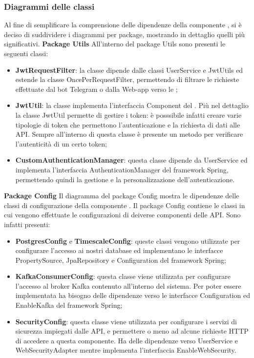 	\subsubsection{Diagrammi delle classi}
		Al fine di semplificare la comprensione delle dipendenze della componente , si è deciso di suddividere i diagrammi per package, mostrando in dettaglio quelli più significativi.
		\newline\newline
		\textbf{Package Utils}
		\newline
		All'interno del package Utils sono presenti le seguenti classi:
		\begin{itemize}
			\item \textbf{JwtRequestFilter}: la classe dipende dalle classi UserService e JwtUtils ed estende la classe OncePerRequestFilter, permettendo di filtrare le richieste effettuate dal bot Telegram o dalla Web-app verso le \glock{API};
			\item \textbf{JwtUtil}: la classe implementa l'interfaccia Component del . Più nel dettaglio la classe JwtUtil permette di gestire i token: è posssibile infatti creare varie tipologie di token che permettono l'autenticazione e la richiesta di dati alle API. Sempre all'interno di questa classe è presente un metodo per verificare l'autenticità di un certo token;
			\item \textbf{CustomAuthenticationManager}: questa classe dipende da UserService ed implementa l'interfaccia AuthenticationManager del framework Spring, permettendo quindi la gestione e la personalizzazione dell'autenticazione.
		\end{itemize}
		\textbf{Package Config} 
		\newline
		Il diagramma del package Config mostra le dipendenze delle classi di configurazione della componente .
		\newline
		Il package Config contiene le classi in cui vengono effettuate le configurazioni di deiverse componenti delle API. Sono infatti presenti:
		\begin{itemize}
			\item \textbf{PostgresConfig} e \textbf{TimescaleConfig}: queste classi vengono utilizzate per configurare l'accesso ai nostri database ed implementano le interfacce PropertySource, JpaRepository e Configuration del framework Spring;
			\item \textbf{KafkaConsumerConfig}: questa classe viene utilizzata per configurare l'accesso al broker Kafka contenuto all'interno del sistema. Per poter essere implementata ha bisogno delle dipendenze verso le interfacce Configuration ed EnableKafka del framework Spring;
			\item \textbf{SecurityConfig}: questa classe viene utilizzata per configurare i servizi di sicurezza impiegati dalle API, e permettere o meno ad alcune richieste HTTP di accedere a questa componente. Ha delle dipendenze verso UserService e WebSecurityAdapter mentre implementa l'interfaccia EnableWebSecurity.
		\end{itemize}
		\pagebreak
		
